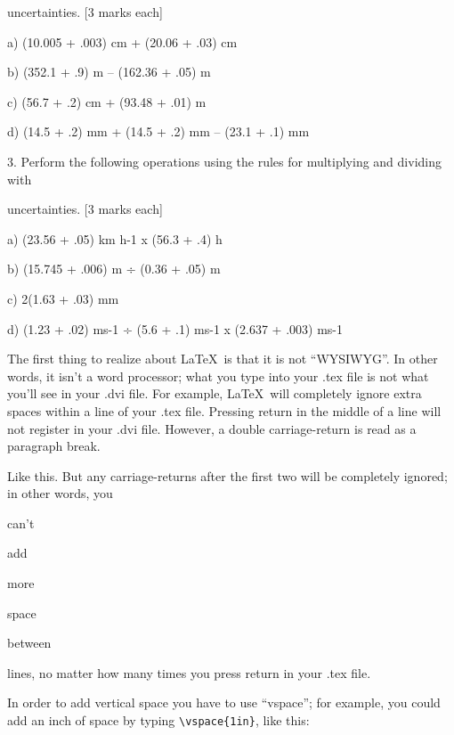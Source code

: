 \documentclass{article}
\begin{document}
uncertainties. [3 marks each]

a) (10.005 + .003) cm + (20.06 + .03) cm 

b) (352.1 + .9) m – (162.36 + .05) m 

c) (56.7 + .2) cm + (93.48 + .01) m 

d) (14.5 + .2) mm + (14.5 + .2) mm – (23.1 + .1) mm

3. Perform the following operations using the rules for multiplying and dividing with 

uncertainties. [3 marks each]

a) (23.56 + .05) km h-1 x (56.3 + .4) h 

b) (15.745 + .006) m ÷ (0.36 + .05) m 

c) 2(1.63 + .03) mm 

d) (1.23 + .02) ms-1 ÷ (5.6 + .1) ms-1 x (2.637 + .003) ms-1













The first thing to realize about \LaTeX\ is that it is not ``WYSIWYG''.
In other words, it isn't a word processor; what you type into your 
.tex file is not what you'll see in your .dvi file.  For example, 
\LaTeX\ will      completely     ignore               extra
spaces    within                             a line of your .tex file.
Pressing return
in 
the 
middle 
of
a
line
will not register in your .dvi file. However, a double carriage-return
is read as a paragraph break.

Like this.  But any carriage-returns after the first two will be 
completely ignored; in other words, you 


can't 

add






more 




space 


between 




lines, no matter how many times you press return in your .tex file.

In order to add vertical space you have to use ``vspace''; for example, 
you could add an inch of space by typing \verb|\vspace{1in}|, like this:
\vspace{1in}
\end{document}
